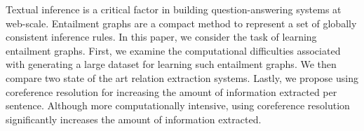 
Textual inference is a critical factor in
building question-answering systems at web-scale. 
Entailment graphs are a compact method to 
represent a set of globally consistent inference rules. 
In this paper, we consider the task of learning entailment graphs. 
First, we examine the computational difficulties associated
with generating a large dataset for learning such entailment graphs.
We then compare two state of the art relation extraction systems.
Lastly, we propose using coreference resolution for increasing the amount of 
information extracted per sentence. Although more computationally
intensive, using coreference resolution significantly increases
the amount of information extracted.



% 


%
%
%
